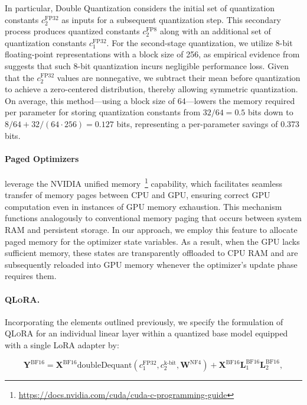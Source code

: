 In particular, Double Quantization considers the initial set of quantization constants $c_2^{\text{FP32}}$ as inputs for a subsequent quantization step. This secondary process produces quantized constants $c_2^{\text{FP8}}$ along with an additional set of quantization constants $c_1^{\text{FP32}}$. For the second-stage quantization, we utilize 8-bit floating-point representations with a block size of 256, as empirical evidence from \citet{dettmers2022case} suggests that such 8-bit quantization incurs negligible performance loss. 
Given that the $c_2^{\text{FP32}}$ values are nonnegative, we subtract their mean before quantization to achieve a zero-centered distribution, thereby allowing symmetric quantization. On average, this method—using a block size of 64—lowers the memory required per parameter for storing quantization constants from $32/64 = 0.5$ bits down to $8/64 + 32/(64\cdot256) = 0.127$ bits, representing a per-parameter savings of 0.373 bits.

\paragraph{Paged Optimizers} leverage the NVIDIA unified memory~\footnote{\tiny \url{https://docs.nvidia.com/cuda/cuda-c-programming-guide}} capability, which facilitates seamless transfer of memory pages between CPU and GPU, ensuring correct GPU computation even in instances of GPU memory exhaustion. This mechanism functions analogously to conventional memory paging that occurs between system RAM and persistent storage. In our approach, we employ this feature to allocate paged memory for the optimizer state variables. As a result, when the GPU lacks sufficient memory, these states are transparently offloaded to CPU RAM and are subsequently reloaded into GPU memory whenever the optimizer's update phase requires them.

\paragraph{\textsc{QLoRA}.} Incorporating the elements outlined previously, we specify the formulation of \textsc{QLoRA} for an individual linear layer within a quantized base model equipped with a single LoRA adapter by:

\begin{equation}
    \mathbf{Y}^{\text{BF16}} =  \mathbf{X}^{\text{BF16}} \text{doubleDequant}(c_1^{\text{FP32}}, c_2^{\text{k-bit}}, \mathbf{W}^{\text{NF4}}) + \mathbf{X}^{\text{BF16}}\mathbf{L}^{\text{BF16}}_1\mathbf{L}^{\text{BF16}}_2,
\end{equation}

